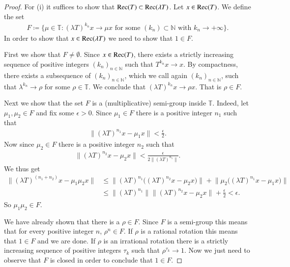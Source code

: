 \documentclass[12pt,leqno]{amsart}
\theoremstyle{plain}
\theoremstyle{definition}
\numberwithin{equation}{section}
\begin{document}
\begin{proof}
	For (i) it suffices to show that ${\textnormal{Rec}}( T)\subset{\textnormal{Rec}}(\lambda T)$. Let $x\in {\textnormal{Rec}}( T) $. We define the set 
	\begin{align*}
		F \coloneqq \{ \mu\in \mathbb T: (\lambda T)^{k_n}x\to \mu x\text{ for some } (k_n)\subset \mathbb N \text{ with }k_n\to+\infty \}. 
	\end{align*}
	In order to show that $x\in {\textnormal{Rec}}(\lambda T)$ we need to show that $1\in F$.
	
	First we show that $F\neq \emptyset$. Since $x\in {\textnormal{Rec}} ( T ) $, there exists a strictly increasing sequence of positive integers $(k_n)_{n\in\mathbb N}$ such that $T^{k_n}x\to x$. By compactness, there exists a subsequence of $(k_n)_{n\in\mathbb N}$, which we call again $(k_n)_{n\in\mathbb N}$, such that $\lambda^{k_n}\to \rho$ for some $\rho\in\mathbb T$. We conclude that $(\lambda T)^{k_n} x\to \rho x$. That is $\rho\in F$.
	
	Next we show that the set $F$ is a (multiplicative) semi-group inside $\mathbb T$. Indeed, let $\mu_1,\mu_2 \in F$ and fix some $\epsilon>0$. Since $\mu_1\in F$ there is a positive integer $n_1$ such that 
	\begin{align*}
		\| (\lambda T)^{n_1}x-\mu_1 x\|<\frac{\epsilon}{2}. 
	\end{align*}
	Now since $\mu_2\in F$ there is a positive integer $n_2$ such that 
	\begin{align*}
		\| (\lambda T)^{n_2}x-\mu_2 x\|<\frac{\epsilon}{2\|(\lambda T)^{n_1}\|}. 
	\end{align*}
	We thus get 
	\begin{align*}
		\|(\lambda T)^{(n_1+n_2)}x-\mu_1 \mu_2 x\| &\leq {\bigl\lVert(\lambda T)^{ n_1}\big((\lambda T)^{n_2}x -\mu_2 x\big)\bigr\rVert_{}} +{\bigl\lVert\mu_2 \big( (\lambda T)^{n_1}x-\mu_1 x\big)\bigr\rVert_{}} \\
		&\leq {\lVert(\lambda T)^{n_1} \rVert_{}} {\lVert(\lambda T)^{n_2}x -\mu_2 x \rVert_{}} + \frac{\epsilon}{2}<\epsilon. 
	\end{align*}
	So $\mu_1\mu_2\in F$.
	
	We have already shown that there is a $\rho\in F$. Since $F$ is a semi-group this means that for every positive integer $n$, $\rho^n\in F$. If $\rho$ is a rational rotation this means that $1\in F$ and we are done. If $\rho$ is an irrational rotation there is a strictly increasing sequence of positive integers $\tau_k$ such that $\rho ^{\tau_k}\to 1$. Now we just need to observe that $F$ is closed in order to conclude that $1\in F$.
	

\end{proof}
\end{document}
